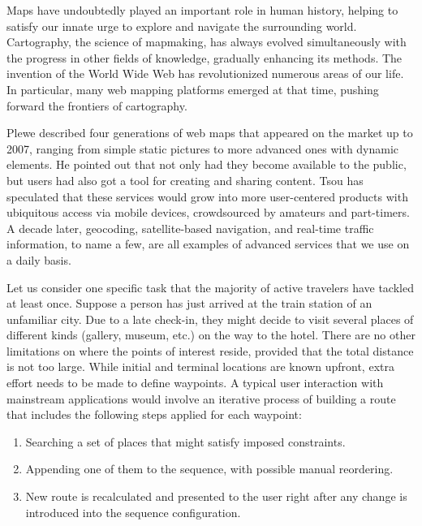 \label{chap:introduction}

Maps have undoubtedly played an important role in human history, helping to satisfy our innate urge to explore and navigate the surrounding world. Cartography, the science of mapmaking, has always evolved simultaneously with the progress in other fields of knowledge, gradually enhancing its methods. The invention of the World Wide Web has revolutionized numerous areas of our life. In particular, many web mapping platforms emerged at that time, pushing forward the frontiers of cartography.

Plewe \cite{plewe07} described four generations of web maps that appeared on the market up to 2007, ranging from simple static pictures to more advanced ones with dynamic elements. He pointed out that not only had they become available to the public, but users had also got a tool for creating and sharing content. Tsou \cite{tsou11} has speculated that these services would grow into more user-centered products with ubiquitous access via mobile devices, crowdsourced by amateurs and part-timers. A decade later, geocoding, satellite-based navigation, and real-time traffic information, to name a few, are all examples of advanced services that we use on a daily basis.

Let us consider one specific task that the majority of active travelers have tackled at least once. Suppose a person has just arrived at the train station of an unfamiliar city. Due to a late check-in, they might decide to visit several places of different kinds (gallery, museum, etc.) on the way to the hotel. There are no other limitations on where the points of interest reside, provided that the total distance is not too large. While initial and terminal locations are known upfront, extra effort needs to be made to define waypoints. A typical user interaction with mainstream applications would involve an iterative process of building a route that includes the following steps applied for each waypoint:

\begin{enumerate}
\item Searching a set of places that might satisfy imposed constraints.
\item Appending one of them to the sequence, with possible manual reordering.
\item New route is recalculated and presented to the user right after any change is introduced into the sequence configuration.
\end{enumerate}

